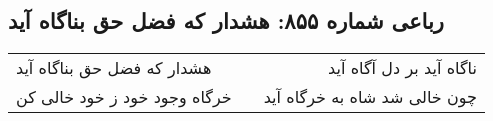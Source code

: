 \begin{center}
\section*{رباعی شماره ۸۵۵: هشدار که فضل حق بناگاه آید}
\label{sec:0855}
\begin{longtable}{l p{0.5cm} r}
هشدار که فضل حق بناگاه آید
&&
ناگاه آید بر دل آگاه آید
\\
خرگاه وجود خود ز خود خالی کن
&&
چون خالی شد شاه به خرگاه آید
\\
\end{longtable}
\end{center}
